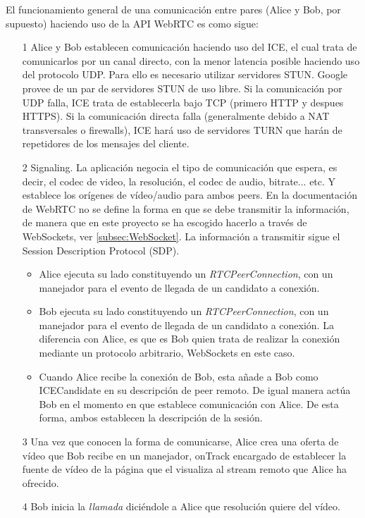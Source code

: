El funcionamiento general de una comunicación entre pares (Alice y Bob, por supuesto) haciendo uso de la API WebRTC es como sigue: 
\begin{itemize}
\item[1] Alice y Bob establecen comunicación haciendo uso del ICE, el cual trata de comunicarlos por un canal directo, con la menor latencia posible haciendo uso del protocolo UDP. Para ello es necesario utilizar servidores STUN. Google provee de un par de servidores STUN de uso libre. Si la comunicación por UDP falla, ICE trata de establecerla bajo TCP (primero HTTP y despues HTTPS). Si la comunicación directa falla (generalmente debido a NAT transversales o firewalls), ICE hará uso de servidores TURN que harán de repetidores de los mensajes del cliente.
\item[2] Signaling. La aplicación negocia el tipo de comunicación que espera, es decir, el codec de video, la resolución, el codec de audio, bitrate... etc. Y establece los orígenes de vídeo/audio para ambos peers. En la documentación de WebRTC no se define la forma en que se debe transmitir la información, de manera que en este proyecto se ha escogido hacerlo a través de WebSockets, ver \ref{subsec:WebSocket}. La información a transmitir sigue el Session Description Protocol (SDP).

\begin{itemize}
\item Alice ejecuta su lado constituyendo un \textit{RTCPeerConnection}, con un manejador para el evento de llegada de un candidato a conexión.
\item Bob ejecuta su lado constituyendo un \textit{RTCPeerConnection}, con un manejador para el evento de llegada de un candidato a conexión. La diferencia con Alice, es que es Bob quien trata de realizar la conexión mediante un protocolo arbitrario, WebSockets en este caso. 
\item Cuando Alice recibe la conexión de Bob, esta añade a Bob como ICECandidate en su descripción de peer remoto. De igual manera actúa Bob en el momento en que establece comunicación con Alice. De esta forma, ambos establecen la descripción de la sesión.
\end{itemize}
\item[3] Una vez que conocen la forma de comunicarse, Alice crea una oferta de vídeo que Bob recibe en un manejador, onTrack encargado de establecer la fuente de vídeo de la página que el visualiza al stream remoto que Alice ha ofrecido.
\item[4] Bob inicia la \textit{llamada} diciéndole a Alice que resolución quiere del vídeo.
\end{itemize}


